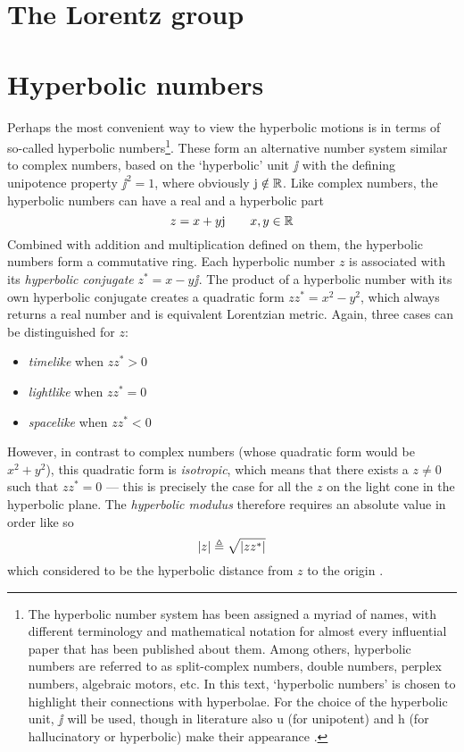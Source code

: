 \section{The Lorentz group}

\section{Hyperbolic numbers}
Perhaps the most convenient way to view the hyperbolic motions is in terms of so-called hyperbolic numbers\footnote{The hyperbolic number system has been assigned a myriad of names, with different terminology and mathematical notation for almost every influential paper that has been published about them. Among others, hyperbolic numbers are referred to as split-complex numbers, double numbers, perplex numbers, algebraic motors, etc. In this text, `hyperbolic numbers' is chosen to highlight their connections with hyperbolae. For the choice of the hyperbolic unit, $\jj$ will be used, though in literature also $\mathrm{u}$ (for unipotent) and $\mathrm{h}$ (for hallucinatory or hyperbolic) make their appearance \cite{Fjelstad1986, Sobczyk1995, Motter1998, Harkin2004}.}. These form an alternative number system similar to complex numbers, based on the `hyperbolic' unit $\jj$ with the defining unipotence property $\jj^2 = 1$, where obviously $\mathrm{j} \notin \mathbb{R}$. Like complex numbers, the hyperbolic numbers can have a real and a hyperbolic part
$$ z = x + y\mathrm{j} \qquad x, y \in \mathbb{R}$$
Combined with addition and multiplication defined on them, the hyperbolic numbers form a commutative ring. Each hyperbolic number $z$ is associated with its \emph{hyperbolic conjugate} $z^* = x - y\jj$. The product of a hyperbolic number with its own hyperbolic conjugate creates a quadratic form $zz^* = x^2 - y^2$, which always returns a real number and is equivalent Lorentzian metric. Again, three cases can be distinguished for $z$:
\begin{itemize}
    \item \emph{timelike} when $zz^* > 0$
    \item \emph{lightlike} when $zz^* = 0$
    \item \emph{spacelike} when $zz^* < 0$
\end{itemize}
However, in contrast to complex numbers (whose quadratic form would be $x^2 + y^2$), this quadratic form is \emph{isotropic}, which means that there exists a $z \neq 0$ such that $zz^* = 0$ --- this is precisely the case for all the $z$ on the light cone in the hyperbolic plane. The \emph{hyperbolic modulus} therefore requires an absolute value in order like so
$$ \abs{z} \triangleq \sqrt{\abs{zz^*}}$$
which considered to be the hyperbolic distance from $z$ to the origin \cite{Sobczyk1995}.

